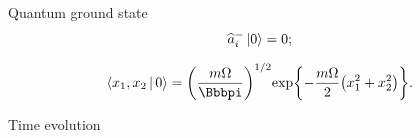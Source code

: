 \begin{nameddef}{Quantum ground state}
\begin{equation}
\widehat{a}_i^-\Ket{0} = 0;
\end{equation}

\begin{equation}
\Braket{x_1, x_2 | 0} = \rbr{\frac{m\Omega}{\pp}}^{1/2}
\cfun{\exp}{-\frac{m\Omega}{2}  \rbr{x_1^2+x_2^2}}.
\end{equation}

\end{nameddef} %


\begin{nameddef}{Time evolution}

\end{nameddef} %